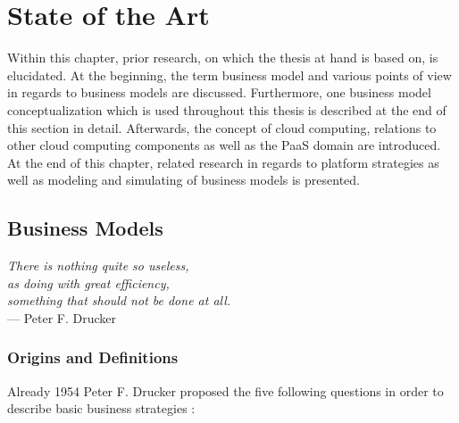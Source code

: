 \chapter{State of the Art}\label{ch:tf}%


Within this chapter, prior research, on which the thesis at hand is based on, is elucidated. At the beginning, the term business model and various points of view in regards to business models are discussed. Furthermore, one business model conceptualization which is used throughout this thesis is described at the end of this section in detail. Afterwards, the concept of cloud computing, relations to other cloud computing components as well as the \ac{PaaS} domain are introduced. At the end of this chapter, related research in regards to platform strategies as well as modeling and simulating of business models is presented.

\section{Business Models}\label{ch:tf:bm}

\begin{flushright}{\slshape    
	There is nothing quite so useless,\\
	as doing with great efficiency, \\
	something that should not be done at all.} \\ \medskip
	--- Peter F. Drucker
\end{flushright}

\vspace*{-18pt}

\subsection{Origins and Definitions}

Already 1954 Peter F. Drucker proposed the five following questions in order to describe basic business strategies \citep[pp. 49-61]{Drucker1954}:

